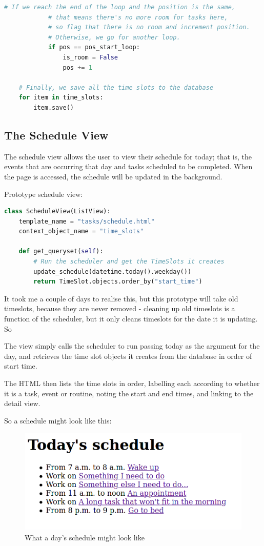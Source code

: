 \documentclass{article}
\begin{document}
\begin{lstlisting}[language=Python]
            # If we reach the end of the loop and the position is the same,
            # that means there's no more room for tasks here,
            # so flag that there is no room and increment position.
            # Otherwise, we go for another loop.
            if pos == pos_start_loop:
                is_room = False
                pos += 1

    # Finally, we save all the time slots to the database
    for item in time_slots:
        item.save()
\end{lstlisting}

\subsection{The Schedule View}
The schedule view allows the user to view their schedule for today;
that is,
the events that are occurring that day and tasks scheduled to be completed.
When the page is accessed,
the schedule will be updated in the background.

Prototype schedule view:
\begin{lstlisting}[language=Python]
class ScheduleView(ListView):
    template_name = "tasks/schedule.html"
    context_object_name = "time_slots"

    def get_queryset(self):
        # Run the scheduler and get the TimeSlots it creates
        update_schedule(datetime.today().weekday())
        return TimeSlot.objects.order_by("start_time")
\end{lstlisting}

It took me a couple of days to realise this,
but this prototype will take old timeslots,
because they are never removed -
cleaning up old timeslots is a function of the scheduler,
but it only cleans timeslots for the date it is updating.
So

The view simply calls the scheduler to run passing today as the argument for the day,
and retrieves the time slot objects it creates from the database in order of start time.

The HTML then lists the time slots in order,
labelling each according to whether it is a task, event or routine,
noting the start and end times,
and linking to the detail view.

So a schedule might look like this:
\begin{figure}[H]
	\centering
	\includegraphics[width=0.8\linewidth]{Screenshots/example_schedule.png}
	\caption{What a day's schedule might look like}
	\label{fig:schedule1}
\end{figure}
\end{document}
